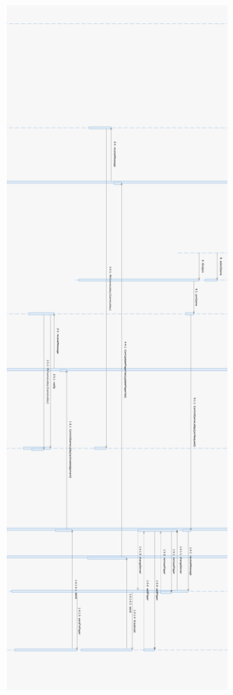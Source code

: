 \documentclass{article}
\begin{document}
\includegraphics[width=14cm, height = 26cm]{Entwurf_PlayCard2_2}\\
\newpage
\addtolength{\oddsidemargin}{1cm}
\end{document}
